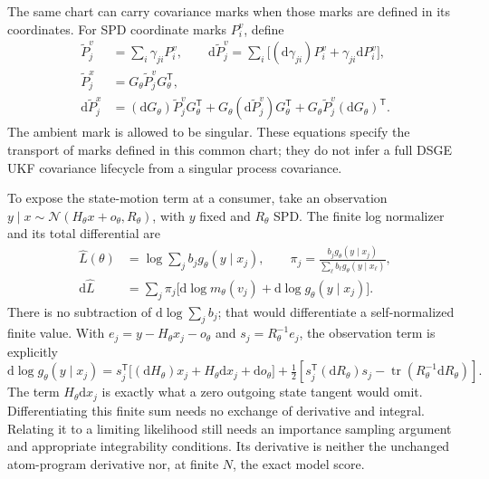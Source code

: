 \documentclass[11pt]{article}
\newcommand{\dd}{\mathrm{d}}
\begin{document}
The same chart can carry covariance marks when those marks are defined in
its coordinates.  For SPD coordinate marks $P_i^v$, define
\begin{align}
 \widetilde P_j^v&=\sum_i\gamma_{ji}P_i^v,\qquad
 \dd\widetilde P_j^v=\sum_i\bigl[(\dd\gamma_{ji})P_i^v
                                  +\gamma_{ji}\dd P_i^v\bigr],\\
 \widetilde P_j^x&=G_\theta\widetilde P_j^vG_\theta^\mathsf{T},\\
 \dd\widetilde P_j^x&=(\dd G_\theta)\widetilde P_j^vG_\theta^\mathsf{T}
       +G_\theta(\dd\widetilde P_j^v)G_\theta^\mathsf{T}
       +G_\theta\widetilde P_j^v(\dd G_\theta)^\mathsf{T}.
 \label{eq:affine-chart-marks}
\end{align}
The ambient mark is allowed to be singular.  These equations specify the
transport of marks defined in this common chart; they do not infer a full
DSGE UKF covariance lifecycle from a singular process covariance.

To expose the state-motion term at a consumer, take an observation
$y\mid x\sim\mathcal N(H_\theta x+o_\theta,R_\theta)$, with $y$ fixed and
$R_\theta$ SPD.  The finite log normalizer and its total differential are
\begin{align}
 \widehat L(\theta)&=\log\sum_j b_j g_\theta(y\mid x_j),\qquad
 \pi_j=\frac{b_jg_\theta(y\mid x_j)}{\sum_\ell b_\ell g_\theta(y\mid x_\ell)},\\
 \dd\widehat L&=\sum_j\pi_j
       \bigl[\dd\log m_\theta(v_j)+\dd\log g_\theta(y\mid x_j)\bigr].
 \label{eq:affine-chart-normalizer}
\end{align}
There is no subtraction of $\dd\log\sum_j b_j$; that would differentiate
a self-normalized finite value.  With
$e_j=y-H_\theta x_j-o_\theta$ and $s_j=R_\theta^{-1}e_j$, the observation
term is explicitly
\begin{equation}
 \dd\log g_\theta(y\mid x_j)
 =s_j^\mathsf{T}\bigl[(\dd H_\theta)x_j
                      +H_\theta\dd x_j+\dd o_\theta\bigr]
 +\tfrac12\left[s_j^\mathsf{T}(\dd R_\theta)s_j
               -\operatorname{tr}(R_\theta^{-1}\dd R_\theta)\right].
 \label{eq:affine-chart-observation}
\end{equation}
The term $H_\theta\dd x_j$ is exactly what a zero outgoing state tangent
would omit.  Differentiating this finite sum needs no exchange of derivative
and integral.  Relating it to a limiting likelihood still needs an importance
sampling argument and appropriate integrability conditions.  Its derivative
is neither the unchanged atom-program derivative nor, at finite $N$, the
exact model score.
\end{document}
